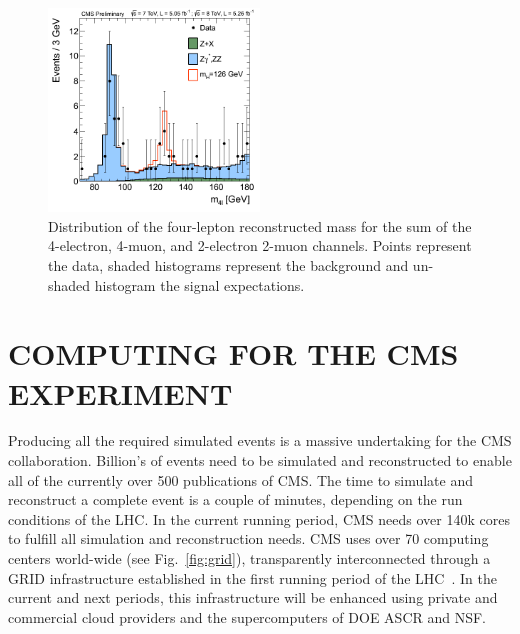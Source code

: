 \documentclass{wscpaperproc}
\theoremstyle{wsc}
\begin{document}
\begin{figure}[htb]
{
   \centering
   \includegraphics[width=0.50\textwidth]{higgs}
   \caption{Distribution of the four-lepton reconstructed mass for the sum of the 4-electron, 4-muon, and 2-electron 2-muon channels. Points represent the data, shaded histograms represent the background and un-shaded histogram the signal expectations.
   \label{fig:higgs}}
}
\end{figure}

\section{COMPUTING FOR THE CMS EXPERIMENT}
\label{sec:computing}

Producing all the required simulated events is a massive undertaking for the CMS collaboration. Billion's of events need to be simulated and reconstructed to enable all of the currently over 500 publications of CMS. The time to simulate and reconstruct a complete event is a couple of minutes, depending on the run conditions of the LHC. In the current running period, CMS needs over 140k cores to fulfill all simulation and reconstruction needs. CMS uses over 70 computing centers world-wide (see Fig.~\ref{fig:grid}), transparently interconnected through a GRID infrastructure established in the first running period of the LHC~. In the current and next periods, this infrastructure will be enhanced using private and commercial cloud providers and the supercomputers of DOE ASCR and NSF.
\end{document}
